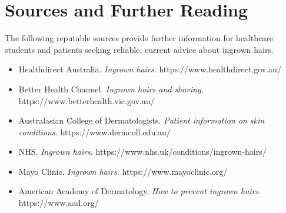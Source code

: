 \section*{Sources and Further Reading}
The following reputable sources provide further information for healthcare students and patients seeking reliable, current advice about ingrown hairs.
\begin{itemize}
    \item Healthdirect Australia. \textit{Ingrown hairs.} https://www.healthdirect.gov.au/
    \item Better Health Channel. \textit{Ingrown hairs and shaving.} https://www.betterhealth.vic.gov.au/
    \item Australasian College of Dermatologists. \textit{Patient information on skin conditions.} https://www.dermcoll.edu.au/
    \item NHS. \textit{Ingrown hairs.} https://www.nhs.uk/conditions/ingrown-hairs/
    \item Mayo Clinic. \textit{Ingrown hairs.} https://www.mayoclinic.org/
    \item American Academy of Dermatology. \textit{How to prevent ingrown hairs.} https://www.aad.org/
\end{itemize}
